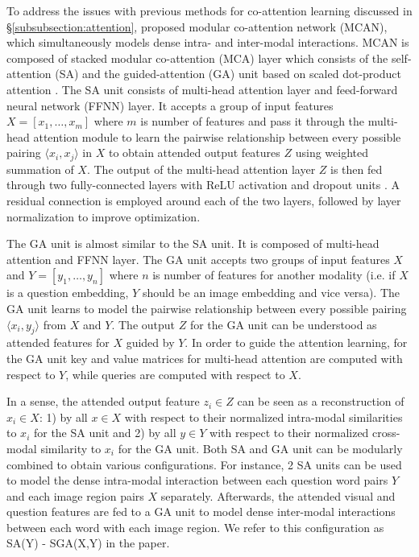 \documentclass{article}
\begin{document}
To address the issues with previous methods for co-attention learning discussed in \S \ref{subsubsection:attention}, \citet{yu2019mcan} proposed modular co-attention network (MCAN), which simultaneously models dense intra- and inter-modal interactions. MCAN is composed of stacked modular co-attention (MCA) layer which consists of the self-attention (SA) and the guided-attention (GA) unit based on scaled dot-product attention \citep{transformers}. The SA unit consists of multi-head attention layer and feed-forward neural network (FFNN) layer. It accepts a group of input features $X = [x_{1}, \dots, x_{m}]$ where $m$ is number of features and pass it through the multi-head attention module to learn the pairwise relationship between every possible pairing $\langle x_{i},x_{j} \rangle$ in $X$ to obtain attended output features $Z$ using weighted summation of $X$. The output of the multi-head attention layer $Z$ is then fed through two fully-connected layers with ReLU activation \citep{relu} and dropout units \citep{dropout}. A residual connection \citep{residual} is employed around each of the two layers, followed by layer normalization \citep{ba2016layer} to improve optimization.

The GA unit is almost similar to the SA unit. It is composed of multi-head attention and FFNN layer. The GA unit accepts two groups of input features $X$ and $Y = [y_{1}, \dots, y_{n}]$ where $n$ is number of features for another modality (i.e. if $X$ is a question embedding, $Y$ should be an image embedding and vice versa). The GA unit learns to model the pairwise relationship between every possible pairing $\langle x_{i},y_{j} \rangle$ from $X$ and $Y$. The output $Z$ for the GA unit can be understood as attended features for $X$ guided by $Y$. In order to guide the attention learning, for the GA unit key and value matrices for multi-head attention are computed with respect to $Y$, while queries are computed with respect to $X$.

In a sense, the attended output feature $z_{i} \in Z$ can be seen as a reconstruction of $x_{i} \in X$: 1) by all $x \in X$ with respect to their normalized intra-modal similarities to $x_{i}$ for the SA unit and 2) by all $y \in Y$ with respect to their normalized cross-modal similarity to $x_{i}$ for the GA unit. Both SA and GA unit can be modularly combined to obtain various configurations. For instance, 2 SA units can be used to model the dense intra-modal interaction between each question word pairs $Y$ and each image region pairs $X$ separately. Afterwards, the attended visual and question features are fed to a GA unit to model dense inter-modal interactions between each word with each image region. We refer to this configuration as SA(Y) - SGA(X,Y) in the paper.
\end{document}
